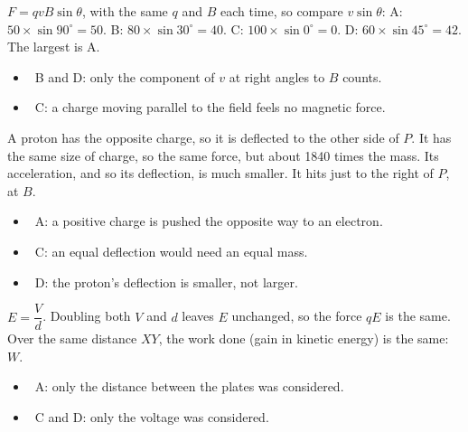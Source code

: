 \documentclass[12pt]{article}
\begin{document}
\begin{practiceanswers}
\begin{practiceans}
  $F = qvB\sin\theta$, with the same $q$ and $B$ each time, so compare $v\sin\theta$:
  A: $50 \times \sin 90^\circ = 50$. B: $80 \times \sin 30^\circ = 40$. C: $100 \times \sin 0^\circ = 0$.
  D: $60 \times \sin 45^\circ = 42$. The largest is A.
  \begin{itemize}
    \item \xmark\ B and D: only the component of $v$ at right angles to $B$ counts.
    \item \xmark\ C: a charge moving parallel to the field feels no magnetic force.
  \end{itemize}
\end{practiceans}

\begin{practiceans}
  A proton has the opposite charge, so it is deflected to the other side of $P$. It has the same size
  of charge, so the same force, but about 1840 times the mass. Its acceleration, and so its deflection,
  is much smaller. It hits just to the right of $P$, at $B$.
  \begin{itemize}
    \item \xmark\ A: a positive charge is pushed the opposite way to an electron.
    \item \xmark\ C: an equal deflection would need an equal mass.
    \item \xmark\ D: the proton's deflection is smaller, not larger.
  \end{itemize}
\end{practiceans}

\begin{practiceans}
  $E = \dfrac{V}{d}$. Doubling both $V$ and $d$ leaves $E$ unchanged, so the force $qE$ is the same.
  Over the same distance $XY$, the work done (gain in kinetic energy) is the same: $W$.
  \begin{itemize}
    \item \xmark\ A: only the distance between the plates was considered.
    \item \xmark\ C and D: only the voltage was considered.
  \end{itemize}
\end{practiceans}


\end{practiceanswers}
\end{document}
